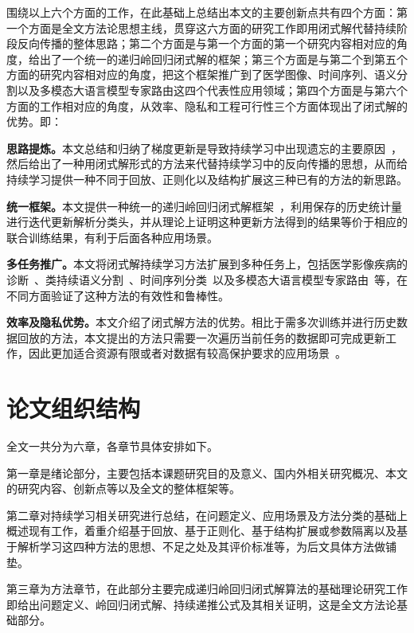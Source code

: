 围绕以上六个方面的工作，在此基础上总结出本文的主要创新点共有四个方面：第一个方面是全文方法论思想主线，贯穿这六方面的研究工作即用闭式解代替持续阶段反向传播的整体思路；第二个方面是与第一个方面的第一个研究内容相对应的角度，给出了一个统一的递归岭回归闭式解的框架；第三个方面是与第二个到第五个方面的研究内容相对应的角度，把这个框架推广到了医学图像、时间序列、语义分割以及多模态大语言模型专家路由这四个代表性应用领域；第四个方面是与第六个方面的工作相对应的角度，从效率、隐私和工程可行性三个方面体现出了闭式解的优势。即：

\textbf{思路提炼。}本文总结和归纳了梯度更新是导致持续学习中出现遗忘的主要原因~\citep{goodfellow2013catastrophic,lopez2017gradient,chaudhry2019continual}，然后给出了一种用闭式解形式的方法来代替持续学习中的反向传播的思想，从而给持续学习提供一种不同于回放、正则化以及结构扩展这三种已有的方法的新思路。

\textbf{统一框架。}本文提供一种统一的递归岭回归闭式解框架~\citep{zhuang2022acil,zhuang2024dsal,fang2024air}，利用保存的历史统计量进行迭代更新解析分类头，并从理论上证明这种更新方法得到的结果等价于相应的联合训练结果，有利于后面各种应用场景。

\textbf{多任务推广。}本文将闭式解持续学习方法扩展到多种任务上，包括医学影像疾病的诊断~\citep{yang2023medmnist}、类持续语义分割~\citep{cermelli2020mib,douillard2021plop}、时间序列分类~\citep{qiao2024tscil}以及多模态大语言模型专家路由~\citep{zhao2025mllm,chen2024coin}等，在不同方面验证了这种方法的有效性和鲁棒性。

\textbf{效率及隐私优势。}本文介绍了闭式解方法的优势。相比于需多次训练并进行历史数据回放的方法，本文提出的方法只需要一次遍历当前任务的数据即可完成更新工作，因此更加适合资源有限或者对数据有较高保护要求的应用场景~\citep{de2021continual,GKEAL_Zhuang_CVPR2023}。

\section{论文组织结构}

全文一共分为六章，各章节具体安排如下。

第一章是绪论部分，主要包括本课题研究目的及意义、国内外相关研究概况、本文的研究内容、创新点等以及全文的整体框架等。

第二章对持续学习相关研究进行总结，在问题定义、应用场景及方法分类的基础上概述现有工作，着重介绍基于回放、基于正则化、基于结构扩展或参数隔离以及基于解析学习这四种方法的思想、不足之处及其评价标准等，为后文具体方法做铺垫。

第三章为方法章节，在此部分主要完成递归岭回归闭式解算法的基础理论研究工作即给出问题定义、岭回归闭式解、持续递推公式及其相关证明，这是全文方法论基础部分。

